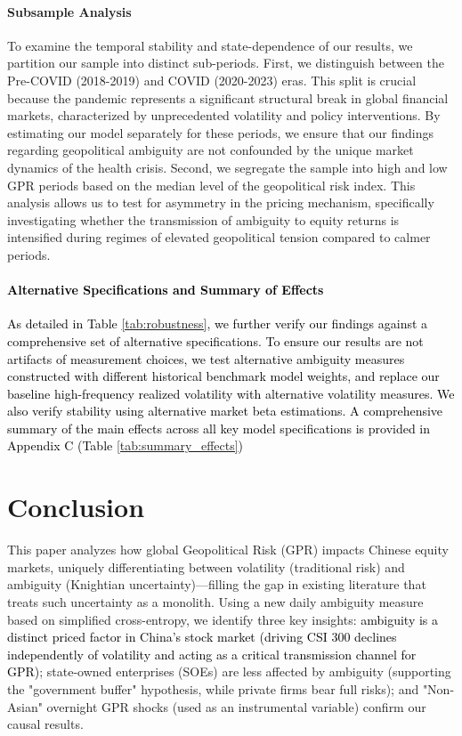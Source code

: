 \documentclass[preprint,12pt,authoryear]{elsarticle}
\begin{document}
\paragraph{Subsample Analysis} To examine the temporal stability and state-dependence of our results, we partition our sample into distinct sub-periods. First, we distinguish between the Pre-COVID (2018-2019) and COVID (2020-2023) eras. This split is crucial because the pandemic represents a significant structural break in global financial markets, characterized by unprecedented volatility and policy interventions. By estimating our model separately for these periods, we ensure that our findings regarding geopolitical ambiguity are not confounded by the unique market dynamics of the health crisis. Second, we segregate the sample into high and low GPR periods based on the median level of the geopolitical risk index. This analysis allows us to test for asymmetry in the pricing mechanism, specifically investigating whether the transmission of ambiguity to equity returns is intensified during regimes of elevated geopolitical tension compared to calmer periods.

\textcolor{black}{\paragraph{Alternative Specifications and Summary of Effects} As detailed in Table \ref{tab:robustness}, we further verify our findings against a comprehensive set of alternative specifications. To ensure our results are not artifacts of measurement choices, we test alternative ambiguity measures constructed with different historical benchmark model weights, and replace our baseline high-frequency realized volatility with alternative volatility measures. We also verify stability using alternative market beta estimations. A comprehensive summary of the main effects across all key model specifications is provided in Appendix C (Table \ref{tab:summary_effects})}

\section{Conclusion}
\label{sec:conclusion}

This paper analyzes how global Geopolitical Risk (GPR) impacts Chinese equity markets, uniquely differentiating between volatility (traditional risk) and ambiguity (Knightian uncertainty)—filling the gap in existing literature that treats such uncertainty as a monolith. Using a new daily ambiguity measure based on simplified cross-entropy, we identify three key insights: \textcolor{black}{ambiguity is a distinct priced factor in China's stock market (driving CSI 300 declines independently of volatility and acting as a critical transmission channel for GPR)}; state-owned enterprises (SOEs) are less affected by ambiguity (supporting the "government buffer" hypothesis, while private firms bear full risks); and "Non-Asian" overnight GPR shocks (used as an instrumental variable) confirm our causal results.
\end{document}

